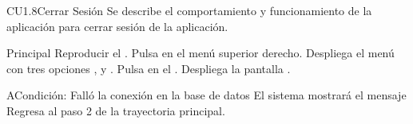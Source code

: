 \begin{UseCase}{CU1.8}{Cerrar Sesión}{
	Se describe el comportamiento y funcionamiento de la aplicación para cerrar sesión de la aplicación.
}
	\end{UseCase}
	\begin{UCtrayectoria}{Principal}
		\UCpaso Reproducir el .
		\UCpaso[\UCactor] Pulsa en el menú superior derecho.
		\UCpaso[\UCsist] Despliega el menú con tres opciones , y .
		\UCpaso[\UCactor] Pulsa en el  .
		\UCpaso[\UCsist] Despliega la pantalla .
	\end{UCtrayectoria}
	\begin{UCtrayectoriaA}{A}{Condición: Falló la conexión en la base de datos}
		\UCpaso[\UCsist] El sistema mostrará el mensaje 
		\UCpaso[\UCsist] Regresa al paso 2 de la trayectoria principal. 
	\end{UCtrayectoriaA}

